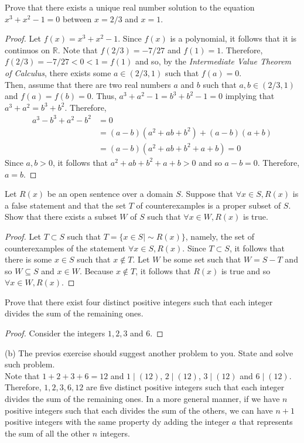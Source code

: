 \documentclass[12pt]{article}
\newcommand{\R}{\mathbb{R}}
\newenvironment{problem}[2][Problem]{\begin{trivlist}
		\item[\hskip \labelsep {\bfseries #1}\hskip \labelsep {\bfseries #2.}]}{\end{trivlist}}
\begin{document}
	\begin{problem}{44}
		Prove that there exists a unique real number solution to the equation $x^{3}+x^{2}-1=0$ between $x=2/3$ and $x=1$.
		\begin{proof}
			Let $f(x) = x^{3}+x^{2}-1$. Since $f(x)$ is a polynomial, it follows that it is continuos on $\R$. Note that $f(2/3) = -7/27$ and $f(1) = 1$. Therefore, $f(2/3) = -7/27 < 0 < 1 = f(1)$ and so, by the \textit{Intermediate Value Theorem of Calculus}, there exists some $a\in (2/3,1)$ such that $f(a)=0$.\\
			Then, assume that there are two real numbers $a$ and $b$ such that  $a,b\in (2/3, 1)$ and $f(a)=f(b)=0$. Thus, $a^{3}+a^{2}-1 = b^{3}+b^{2}-1 = 0$ implying that $a^{3}+a^{2} = b^{3}+b^{2}$. Therefore,
			\begin{align*}
				a^{3}-b^{3}+a^{2}-b^{2} &= 0\\
				&= (a-b)(a^{2}+ab+b^{2}) + (a-b)(a+b)\\
				&= (a-b)(a^{2}+ab+b^{2} +a+b) = 0
			\end{align*}
		Since $a,b>0$, it follows that $a^{2}+ab+b^{2} +a+b>0$ and so $a-b=0$. Therefore, $a=b$.
		\end{proof}
	\end{problem}

	\begin{problem}{45}
		Let $R(x)$ be an open sentence over a domain $S$. Suppose that $\forall x \in S, R(x)$ is a false statement and that the set $T$ of counterexamples is a proper subset of $S$. Show that there exists a subset $W$ of $S$ such that $\forall x \in W, R(x)$ is true.
		\begin{proof} 
			Let $T\subset S$ such that $T=\{x\in S| \sim R(x)\}$, namely, the set of counterexamples of the statement $\forall x \in S, R(x)$. Since $T\subset S$, it follows that there is some $x\in S$ such that $x\not\in T$. Let $W$ be some set such that $W=S-T$ and so $W\subseteq S$ and $x\in W$. Because $x\not\in T$, it follows that $R(x)$ is true and so $\forall x\in W, R(x)$.
		\end{proof}
	\end{problem}

	\begin{problem}{46}
		Prove that there exist four distinct positive integers such that each integer divides the sum of the remaining ones.
		\begin{proof}
			Consider the integers $1,2,3$ and $6$.
		\end{proof}
		(b) The previos exercise should suggest another problem to you. State and solve such problem.\\
		
		Note that $1+2+3+6 =12$ and $1\mid (12)$, $2\mid(12)$, $3\mid (12)$ and $6\mid(12)$. Therefore, $1,2,3,6,12$ are five distinct positive integers such that each integer divides the sum of the remaining ones. In a more general manner, if we have $n$ positive integers such that each divides the sum of the others, we can have $n+1$ positive integers with the same property dy adding the integer $a$ that represents the sum of all the other $n$ integers. 
	\end{problem} 
\end{document}
